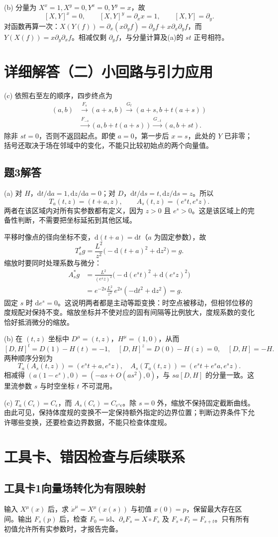 \documentclass[11pt,a4paper]{article}
\newcommand{\D}{\mathrm d}
\newcommand{\head}[1]{\section*{\color{teal}#1}}
\begin{document}
(b) 分量为 $X^x=1,X^y=0,Y^x=0,Y^y=x$，故
\[
 [X,Y]^x=0,\qquad [X,Y]^y=\partial_x x=1,\qquad [X,Y]=\partial_y.
\]
对函数再算一次：$X(Y(f))=\partial_x(x\partial_yf)=\partial_yf+x\partial_x\partial_yf$，而 $Y(X(f))=x\partial_y\partial_xf$。相减仅剩 $\partial_yf$，与分量计算及(a)的 $st$ 正号相符。
\newpage
\head{详细解答（二）\quad 小回路与引力应用}
(c) 依照右至左的顺序，四步终点为
\begin{align*}
 (a,b)&\xrightarrow{F_s}(a+s,b)
 \xrightarrow{G_t}(a+s,b+t(a+s))\\
 &\xrightarrow{F_{-s}}(a,b+t(a+s))
 \xrightarrow{G_{-t}}(a,b+st).
\end{align*}
除非 $st=0$，否则不返回起点。即使 $a=0$，第一步后 $x=s$，此处的 $Y$ 已非零；括号还取决于场在邻域中的变化，不能只比较初始点的两个向量值。
\subsection*{题3解答}
(a) 对 $H$，$\D t/\D a=1,\D z/\D a=0$；对 $D$，$\D t/\D s=t,\D z/\D s=z$。所以
\[
 T_a(t,z)=(t+a,z),\qquad A_s(t,z)=(e^st,e^sz).
\]
两者在该区域内对所有实参数都有定义，因为 $z>0$ 且 $e^s>0$。这是该区域上的完备性判断，不需要把坐标延拓到其他区域。

平移时像点的径向坐标不变，$\D(t+a)=\D t$（$a$ 为固定参数），故
\[
 T_a^*g=\frac{L^2}{z^2}\bigl(-\D(t+a)^2+\D z^2\bigr)=g.
\]
缩放时要同时处理系数与微分：
\begin{align*}
 A_s^*g
 &=\frac{L^2}{(e^sz)^2}\bigl(-\D(e^st)^2+\D(e^sz)^2\bigr)\\
 &=e^{-2s}\frac{L^2}{z^2}\,e^{2s}(-\D t^2+\D z^2)=g.
\end{align*}
固定 $s$ 时 $\D e^s=0$。这说明两者都是主动等距变换：时空点被移动，但相邻位移的度规配对保持不变。缩放坐标并不使对应的固有间隔等比例放大，度规系数的变化恰好抵消微分的缩放。

(b) 在 $(t,z)$ 坐标中 $D^\mu=(t,z)$，$H^\mu=(1,0)$，从而
\[
 [D,H]^t=D(1)-H(t)=-1,\quad [D,H]^z=D(0)-H(z)=0,
 \quad [D,H]=-H.
\]
两种顺序分别为
\[
 T_a(A_s(t,z))=(e^st+a,e^sz),\quad
 A_s(T_a(t,z))=(e^st+e^sa,e^sz).
\]
相减得 $(a(1-e^s),0)=(-as+O(as^2),0)$，与 $sa[D,H]$ 的分量一致。这里流参数 $s$ 与时空坐标 $t$ 不可混用。

(c) $T_a(C_\epsilon)=C_\epsilon$，而 $A_s(C_\epsilon)=C_{e^s\epsilon}$。除 $s=0$ 外，缩放不保持固定截断曲线。由此可见，保持体度规的变换不一定保持额外指定的边界位置；判断边界条件下允许哪些变换，还要检查边界数据，不能只检查体度规。
\newpage
\head{工具卡、错因检查与后续联系}
\subsection*{工具卡1\quad 向量场转化为有限映射}
输入 $X^\mu(x)$ 后，求 $\dot x^\mu=X^\mu(x(s))$ 与初值 $x(0)=p$，保留最大存在区间。输出 $F_s(p)$ 后，检查 $F_0=\mathrm{id}$、$\partial_sF_s=X\circ F_s$ 及 $F_s\circ F_t=F_{s+t}$。只有所有初值允许所有实参数时，才报告完备。
\end{document}
